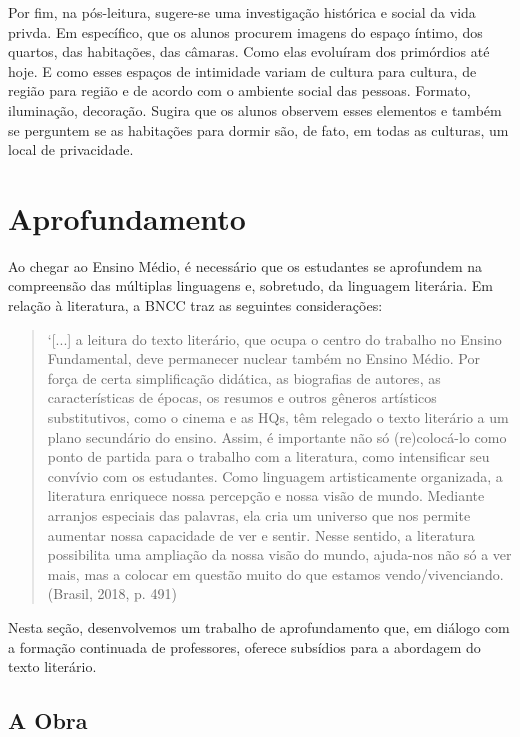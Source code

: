 \documentclass[12pt]{extarticle}
\begin{document}
Por fim, na pós-leitura, sugere-se uma investigação
histórica e social da vida privda. Em específico, que os alunos procurem
imagens do espaço íntimo, dos quartos, das habitações, das câmaras. Como
elas evoluíram dos primórdios até hoje. E como esses espaços de
intimidade variam de cultura para cultura, de região para região e de
acordo com o ambiente social das pessoas. Formato, iluminação,
decoração. Sugira que os alunos observem esses elementos e também se
perguntem se as habitações para dormir são, de fato, em todas as
culturas, um local de privacidade.

\section{Aprofundamento}

Ao chegar ao Ensino Médio, é necessário que os estudantes se aprofundem
na compreensão das múltiplas linguagens e, sobretudo, da linguagem
literária. Em relação à literatura, a BNCC traz as seguintes
considerações:

\begin{quote}
`{[}...{]} a leitura do texto literário, que ocupa o centro do trabalho
no Ensino Fundamental, deve permanecer nuclear também no Ensino Médio.
Por força de certa simplificação didática, as biografias de autores, as
características de épocas, os resumos e outros gêneros artísticos
substitutivos, como o cinema e as HQs, têm relegado o texto literário a
um plano secundário do ensino. Assim, é importante não só (re)colocá-lo
como ponto de partida para o trabalho com a literatura, como
intensificar seu convívio com os estudantes. Como linguagem
artisticamente organizada, a literatura enriquece nossa percepção e
nossa visão de mundo. Mediante arranjos especiais das palavras, ela cria
um universo que nos permite aumentar nossa capacidade de ver e sentir.
Nesse sentido, a literatura possibilita uma ampliação da nossa visão do
mundo, ajuda-nos não só a ver mais, mas a colocar em questão muito do
que estamos vendo/vivenciando. (Brasil, 2018, p. 491)
\end{quote}

Nesta seção, desenvolvemos um trabalho de aprofundamento que, em diálogo
com a formação continuada de professores, oferece subsídios para a
abordagem do texto literário.

\subsection{A Obra}
\end{document}
